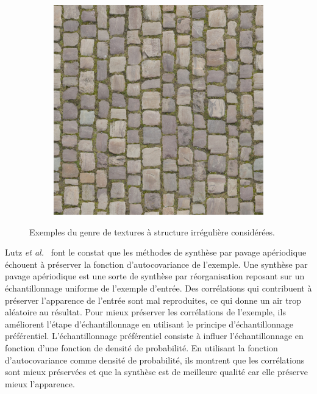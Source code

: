 \begin{figure}
\begin{subfigure}{.3\textwidth}
    \end{subfigure}
    \hfill
    \begin{subfigure}{.3\textwidth}
        \centering
        \includegraphics[width=\textwidth]{contenu/resources/images/texture_3}
    \end{subfigure}

    \caption{Exemples du genre de textures à structure irrégulière considérées.}
    \label{fig:typical-textures}
\end{figure}


Lutz \textit{et al.}~\cite{lutz_preserving_2023} font le constat que les méthodes de synthèse par pavage apériodique échouent à préserver la fonction d'autocovariance de l'exemple. Une synthèse par pavage apériodique est une sorte de synthèse par réorganisation reposant sur un échantillonnage uniforme de l'exemple d'entrée. Des corrélations qui contribuent à préserver l'apparence de l'entrée sont mal reproduites, ce qui donne un air trop aléatoire au résultat. Pour mieux préserver les corrélations de l'exemple, ils améliorent l'étape d'échantillonnage en utilisant le principe d'échantillonnage préférentiel. L'échantillonnage préférentiel consiste à influer l'échantillonnage en fonction d'une fonction de densité de probabilité. En utilisant la fonction d'autocovariance comme densité de probabilité, ils montrent que les corrélations sont mieux préservées et que la synthèse est de meilleure qualité car elle préserve mieux l'apparence.

